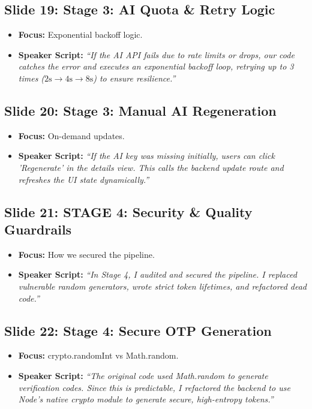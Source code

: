\documentclass[11pt]{article}
\begin{document}
\subsection{Slide 19: Stage 3: AI Quota \& Retry Logic}
\begin{itemize}
    \item \textbf{Focus:} Exponential backoff logic.
    \item \textbf{Speaker Script:} 
    \textit{``If the AI API fails due to rate limits or drops, our code catches the error and executes an exponential backoff loop, retrying up to 3 times ($2\text{s} \to 4\text{s} \to 8\text{s}$) to ensure resilience.''}
\end{itemize}

\subsection{Slide 20: Stage 3: Manual AI Regeneration}
\begin{itemize}
    \item \textbf{Focus:} On-demand updates.
    \item \textbf{Speaker Script:} 
    \textit{``If the AI key was missing initially, users can click 'Regenerate' in the details view. This calls the backend update route and refreshes the UI state dynamically.''}
\end{itemize}

\subsection{Slide 21: STAGE 4: Security \& Quality Guardrails}
\begin{itemize}
    \item \textbf{Focus:} How we secured the pipeline.
    \item \textbf{Speaker Script:} 
    \textit{``In Stage 4, I audited and secured the pipeline. I replaced vulnerable random generators, wrote strict token lifetimes, and refactored dead code.''}
\end{itemize}

\subsection{Slide 22: Stage 4: Secure OTP Generation}
\begin{itemize}
    \item \textbf{Focus:} crypto.randomInt vs Math.random.
    \item \textbf{Speaker Script:} 
    \textit{``The original code used Math.random to generate verification codes. Since this is predictable, I refactored the backend to use Node's native crypto module to generate secure, high-entropy tokens.''}
\end{itemize}
\end{document}
